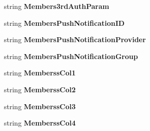 \begin{DoxyCompactItemize}
\item 
string {\bfseries Members3rd\+Auth\+Param}\hypertarget{a00115_a259eb95d22c76787838b6d4b47d84e0a}{}\label{a00115_a259eb95d22c76787838b6d4b47d84e0a}

\item 
string {\bfseries Members\+Push\+Notification\+ID}\hypertarget{a00115_abe1659e1b21a6cf21189a621ea1764e0}{}\label{a00115_abe1659e1b21a6cf21189a621ea1764e0}

\item 
string {\bfseries Members\+Push\+Notification\+Provider}\hypertarget{a00115_a10d79db81e504fc4cf59af4abca70eda}{}\label{a00115_a10d79db81e504fc4cf59af4abca70eda}

\item 
string {\bfseries Members\+Push\+Notification\+Group}\hypertarget{a00115_a6f1c680ed5b578b3df4c215c298a5a5d}{}\label{a00115_a6f1c680ed5b578b3df4c215c298a5a5d}

\item 
string {\bfseries Memberss\+Col1}\hypertarget{a00115_ae20cfb5a96bf7be3f77b21cc16e589ad}{}\label{a00115_ae20cfb5a96bf7be3f77b21cc16e589ad}

\item 
string {\bfseries Memberss\+Col2}\hypertarget{a00115_a6ba51d834f927686d5726128510d4dfd}{}\label{a00115_a6ba51d834f927686d5726128510d4dfd}

\item 
string {\bfseries Memberss\+Col3}\hypertarget{a00115_acc015ddb9339a5abfb6b06fb0d6b37e9}{}\label{a00115_acc015ddb9339a5abfb6b06fb0d6b37e9}

\item 
string {\bfseries Memberss\+Col4}\hypertarget{a00115_ae38783e380eb043ec9c8da18b76ebf60}{}\label{a00115_ae38783e380eb043ec9c8da18b76ebf60}


\end{DoxyCompactItemize}
